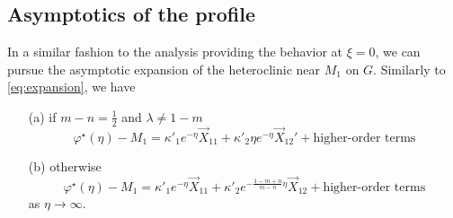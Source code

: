 \documentclass[a4paper,11pt]{article}
\numberwithin{step}{dummy}
\begin{document}
\subsection{Asymptotics of the profile}
In a similar fashion to the analysis providing the behavior at $\xi = 0$, we can pursue the asymptotic expansion of the heteroclinic
near $M_1$ on $G$.  Similarly to \eqref{eq:expansion}, we have
\begin{enumerate}
 \item[(a)] if $m-n = \frac{1}{2}$ and $\lambda \ne 1-m$
 \begin{equation}
 \varphi^\star(\eta) - M_1 = \kappa'_1e^{-\eta} \vec{X}_{11} + \kappa'_2\eta e^{- \eta} \vec{X}_{12}' + \text{higher-order terms} \label{eq:expansion2_special}
 \end{equation}
 \item[(b)] otherwise 
   \begin{equation}
 \varphi^\star(\eta) - M_1 = \kappa'_1e^{-\eta} \vec{X}_{11} + \kappa'_2e^{- \frac{1-m+n}{m-n}\eta} \vec{X}_{12} + \text{higher-order terms} \label{eq:expansion2}
\end{equation}
as $\eta \rightarrow \infty$.
\end{enumerate}
\end{document}
